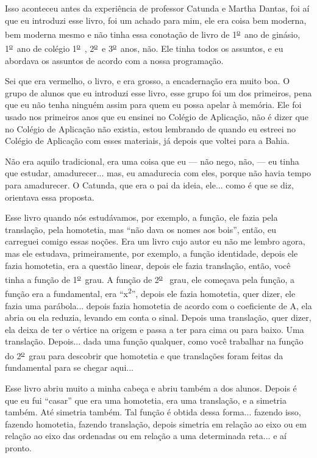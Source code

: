 \documentclass{hipatia}
\newcommand{\superou}{\textsuperscript{\underline{o}}~}
\begin{document}
Isso aconteceu antes da experiência de professor Catunda e Martha
Dantas, foi aí que eu introduzi esse livro, foi um achado para mim, ele
era coisa bem moderna, bem moderna mesmo e não tinha essa conotação de
livro de 1\superou  ano de ginásio, 1\superou  ano de colégio 1\superou , 2\superou  e 3\superou  anos, não. Ele
tinha todos os assuntos, e eu abordava os assuntos de acordo com a nossa
programação.

Sei que era vermelho, o livro, e era grosso, a encadernação era muito
boa. O grupo de alunos que eu introduzi esse livro, esse grupo foi um
dos primeiros, pena que eu não tenha ninguém assim para quem eu possa
apelar à memória. Ele foi usado nos primeiros anos que eu ensinei no
Colégio de Aplicação, não é dizer que no Colégio de Aplicação não
existia, estou lembrando de quando eu estreei no Colégio de Aplicação
com esses materiais, já depois que voltei para a Bahia.

Não era aquilo tradicional, era uma coisa que eu --- não nego, não, --- eu
tinha que estudar, amadurecer... mas, eu amadurecia com eles, porque não
havia tempo para amadurecer. O Catunda, que era o pai da ideia, ele...
como é que se diz, orientava essa proposta.

Esse livro quando nós estudávamos, por exemplo, a função, ele fazia pela
translação, pela homotetia, mas ``não dava os nomes aos bois'', então,
eu carreguei comigo essas noções. Era um livro cujo autor eu não me
lembro agora, mas ele estudava, primeiramente, por exemplo, a função
identidade, depois ele fazia homotetia, era a questão linear, depois ele
fazia translação, então, você tinha a função de 1\superou  grau. A função de 2\superou 
grau, ele começava pela função, a função era a fundamental, era
``x\textsuperscript{2}'', depois ele fazia homotetia, quer dizer, ele
fazia uma parábola... depois fazia homotetia de acordo com o coeficiente
de A, ela abria ou ela reduzia, levando em conta o sinal. Depois uma
translação, quer dizer, ela deixa de ter o vértice na origem e passa a
ter para cima ou para baixo. Uma translação. Depois... dada uma função
qualquer, como você trabalhar na função do 2\superou  grau para descobrir que
homotetia e que translações foram feitas da fundamental para se chegar
aqui...

Esse livro abriu muito a minha cabeça e abriu também a dos alunos.
Depois é que eu fui ``casar'' que era uma homotetia, era uma translação, e a
simetria também. Até simetria também. Tal função é obtida dessa forma...
fazendo isso, fazendo homotetia, fazendo translação, depois simetria em
relação ao eixo ou em relação ao eixo das ordenadas ou em relação a uma
determinada reta... e aí pronto.
\end{document}
